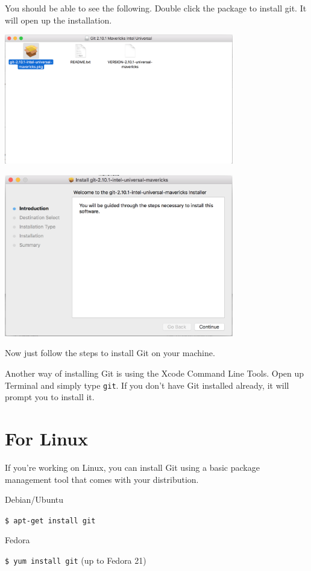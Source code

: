 \documentclass[12pt]{report}
\newcommand\code[1]{{\color{blue}\texttt{#1}}}
\begin{document}
You should be able to see the following. Double click the package to install git. It will open up the installation.

\includegraphics[width=0.75\textwidth]{git-mac-pkg.png}

\includegraphics[width=0.75\textwidth]{git-mac.png}

Now just follow the steps to install Git on your machine.

\noindent
Another way of installing Git is using the Xcode Command Line Tools. Open up Terminal 
and simply type \code{git}. If you don’t have Git installed already, it will prompt you to install it.

\section{For Linux}

If you're working on Linux, you can install Git using a basic package management tool that comes with your distribution.

Debian/Ubuntu

\code{\$ apt-get install git}

\bigskip

Fedora

\code{\$ yum install git} (up to Fedora 21)
\end{document}
